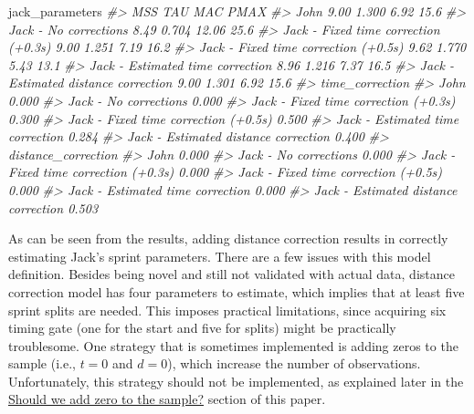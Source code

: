 \documentclass[fleqn,10pt,lineno]{wlpeerj} %
\newenvironment{Shaded}{\begin{snugshade}}{\end{snugshade}}
\newcommand{\CommentTok}[1]{\textcolor[rgb]{0.56,0.35,0.01}{\textit{#1}}}
\newcommand{\NormalTok}[1]{#1}
\begin{document}
\begin{Shaded}
\begin{Highlighting}[]
\NormalTok{jack\_parameters}
\CommentTok{\#\textgreater{}                                       MSS   TAU   MAC PMAX}
\CommentTok{\#\textgreater{} John                                 9.00 1.300  6.92 15.6}
\CommentTok{\#\textgreater{} Jack {-} No corrections                8.49 0.704 12.06 25.6}
\CommentTok{\#\textgreater{} Jack {-} Fixed time correction (+0.3s) 9.00 1.251  7.19 16.2}
\CommentTok{\#\textgreater{} Jack {-} Fixed time correction (+0.5s) 9.62 1.770  5.43 13.1}
\CommentTok{\#\textgreater{} Jack {-} Estimated time correction     8.96 1.216  7.37 16.5}
\CommentTok{\#\textgreater{} Jack {-} Estimated distance correction 9.00 1.301  6.92 15.6}
\CommentTok{\#\textgreater{}                                      time\_correction}
\CommentTok{\#\textgreater{} John                                           0.000}
\CommentTok{\#\textgreater{} Jack {-} No corrections                          0.000}
\CommentTok{\#\textgreater{} Jack {-} Fixed time correction (+0.3s)           0.300}
\CommentTok{\#\textgreater{} Jack {-} Fixed time correction (+0.5s)           0.500}
\CommentTok{\#\textgreater{} Jack {-} Estimated time correction               0.284}
\CommentTok{\#\textgreater{} Jack {-} Estimated distance correction           0.400}
\CommentTok{\#\textgreater{}                                      distance\_correction}
\CommentTok{\#\textgreater{} John                                               0.000}
\CommentTok{\#\textgreater{} Jack {-} No corrections                              0.000}
\CommentTok{\#\textgreater{} Jack {-} Fixed time correction (+0.3s)               0.000}
\CommentTok{\#\textgreater{} Jack {-} Fixed time correction (+0.5s)               0.000}
\CommentTok{\#\textgreater{} Jack {-} Estimated time correction                   0.000}
\CommentTok{\#\textgreater{} Jack {-} Estimated distance correction               0.503}
\end{Highlighting}
\end{Shaded}

As can be seen from the results, adding distance correction results in correctly estimating Jack's sprint parameters. There are a few issues with this model definition. Besides being novel and still not validated with actual data, distance correction model has four parameters to estimate, which implies that at least five sprint splits are needed. This imposes practical limitations, since acquiring six timing gate (one for the start and five for splits) might be practically troublesome. One strategy that is sometimes implemented is adding zeros to the sample (i.e., \(t=0\) and \(d=0\)), which increase the number of observations. Unfortunately, this strategy should not be implemented, as explained later in the \protect\hyperlink{should-we-add-zero-to-the-sample}{Should we add zero to the sample?} section of this paper.
\end{document}
